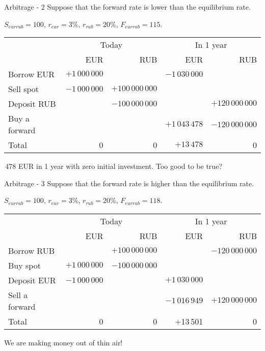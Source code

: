 \documentclass{beamer}
\begin{document}
\begin{frame}{Arbitrage - 2}
\justify
Suppose that the forward rate is lower than the equilibrium rate.

$S_{eurrub}=100$, $r_{eur}=3\%$, $r_{rub}=20\%$, $F_{eurrub}=115$. 

\justify
\centering
\small{
\begin{tabular}{l|r|r|r|r}
& \multicolumn{2}{c|}{Today} & \multicolumn{2}{c}{In 1 year} \\ \cline{2-5}
& EUR & RUB & EUR & RUB \\ \hline
Borrow EUR     & $+1\,000\,000$ &                                   & $-1\,030\,000$ & \\
Sell spot            & $-1\,000\,000$ & $+100\,000\,000$ &                               & \\
Deposit RUB    &                                & $-100\,000\,000$  &                                & $+120\,000\,000$ \\
Buy a forward &                               &                                 & $+1\,043\,478$ & $-120\,000\,000$ \\ \hline
Total & 0 & 0 & $+13\,478$ & 0
\end{tabular}
}

\,478 EUR in 1 year with zero initial investment. Too good to be true?
\end{frame}



\begin{frame}{Arbitrage -  3}
\justify
Suppose that the forward rate is higher than the equilibrium rate.

 $S_{eurrub}=100$, $r_{eur}=3\%$, $r_{rub}=20\%$, $F_{eurrub}=118$. 

\justify
\centering
\small{
\begin{tabular}{l|r|r|r|r}
& \multicolumn{2}{c|}{Today} & \multicolumn{2}{c}{In 1 year} \\ \cline{2-5}
& EUR & RUB & EUR & RUB \\ \hline
Borrow RUB     &                               & $+100\,000\,000$  &                            & $-120\,000\,000$  \\
Buy spot            & $+1\,000\,000$ & $-100\,000\,000$ &                               &   \\
Deposit EUR    &  $-1\,000\,000$  &                                 & $+1\,030\,000$ &  \\
Sell a forward &                               &                                & $-1\,016\,949$ & $+120\,000\,000$ \\ \hline
Total & 0 & 0 & +13\,501 & 0
\end{tabular}
}

\justify
We are making money out of thin air!
\end{frame}
\end{document}
